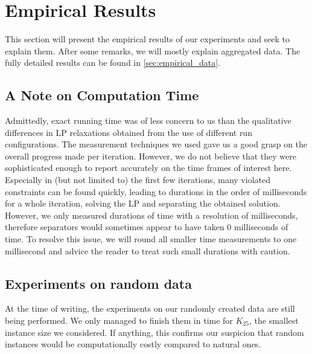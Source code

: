 \section{Empirical Results}\label{sec:empirical_results}
This section will present the empirical results of our experiments and seek to explain them.
After some remarks, we will mostly explain aggregated data.
The fully detailed results can be found in \cref{sec:empirical_data}.

\subsection{A Note on Computation Time}
Admittedly, exact running time was of less concern to us than the qualitative differences in LP relaxations obtained from the use of different run configurations.
The measurement techniques we used gave us a good grasp on the overall progress made per iteration.
However, we do not believe that they were sophisticated enough to report accurately on the time frames of interest here.
Especially in (but not limited to) the first few iterations, many violated constraints can be found quickly,
leading to durations in the order of milliseconds for a whole iteration, \ie solving the LP and separating the obtained solution.
However, we only measured durations of time with a resolution of milliseconds, therefore separators would sometimes appear to have taken 0 milliseconds of time.
To resolve this issue, we will round all smaller time measurements to one millisecond and advice the reader to treat such small durations with caution.

\subsection{Experiments on random data}
At the time of writing, the experiments on our randomly created data are still being performed.
We only managed to finish them in time for $K_{25}$, the smallest instance size we considered.
If anything, this confirms our suspicion that random instances would be computationally costly compared to natural ones.
